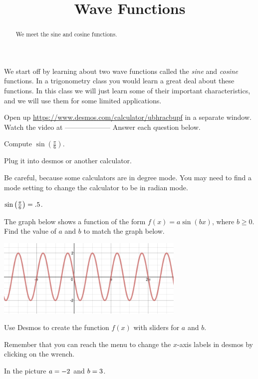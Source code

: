 \documentclass{ximera}
\title{Wave Functions}
\begin{document}
\begin{abstract}
We meet the sine and cosine functions.
\end{abstract}
\maketitle


We start off by learning about two wave functions called the \emph{sine} and \emph{cosine} functions. In a trigonometry class you would learn a great deal about these functions. In this class we will just learn some of their important characteristics, and we will use them for some limited applications.

Open up \url{https://www.desmos.com/calculator/ubhracbupf} in a separate window. Watch the video at  -------------------- Answer each question below.

\begin{exercise}
Compute $\sin\left(\frac{\pi}{6}\right)$.
\begin{solution} 
\begin{hint}
Plug it into desmos or another calculator. 
\end{hint}
\begin{hint}
Be careful, because some calculators are in degree mode. You may need to find a mode setting to change the calculator to be in radian mode.
\end{hint}
$\sin\left(\frac{\pi}{6}\right)={.5}$.
\end{solution}
\end{exercise}

\begin{question}
The graph below shows a function of the form $f(x)=a\sin(bx)$, where $b\ge0$. Find the value of $a$ and $b$ to match the graph below.
\begin{image}
\includegraphics[width=9cm]{ParentFunctions2/MoreParentFunctions/mysterysine.png}
\end{image}
\begin{solution}
\begin{hint}
Use Desmos to create the function $f(x)$ with sliders for $a$ and $b$. 
\end{hint}
\begin{hint}
Remember that you can reach the menu to change the $x$-axis labels in desmos by clicking on the wrench.
\end{hint}
In the picture $a={-2}$ and $b={3}$.
\end{solution}
\end{question}
\end{document}
